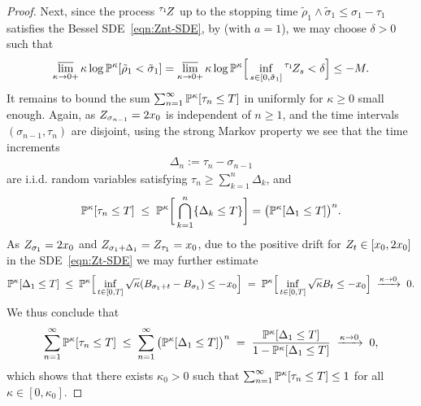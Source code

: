 \documentclass[a4paper, 11pt]{article}
\theoremstyle{definition}
\numberwithin{equation}{section}
\numberwithin{figure}{section}
\renewcommand{\limsup}{\varlimsup}
\newcommand{\Zprocess}[1][]{{\ifx&#1&\else{^{#1 \!}}\fi}Z}
\newcommand{\BMmeasure}[2][]{\bP^{#2}_{\!#1}}
\begin{document}
\begin{proof}
Next, since the process $\Zprocess[\tau_1]$ up to the stopping time $\tilde \rho_1 \wedge \tilde \sigma_1 \le \sigma_1-\tau_1$ 
satisfies the Bessel SDE~\eqref{eqn:Znt-SDE}, 
by  (with $a=1$),  
we may choose $\delta > 0$ such that 
\begin{align*}
\limsup_{\kappa \to 0+} \kappa\log\BMmeasure{\kappa}[\tilde \rho_1 < \tilde \sigma_1] 
= \limsup_{\kappa \to 0+}\kappa\log\BMmeasure{\kappa} \Big[\inf_{s \in [0,\tilde \sigma_1]} \Zprocess[\tau_1]_s < \delta \Big] \le -M.
\end{align*}
It remains to bound the sum $\sum_{n = 1}^\infty \BMmeasure{\kappa}[\tau_n \le T]$ in  
uniformly for $\kappa \geq 0$ small enough. 
Again, as $\Zprocess_{\sigma_{n-1}} = 2x_0$ is independent of $n \ge 1$, and the time intervals $(\sigma_{n-1}, \tau_n)$ are disjoint, 
using the strong Markov property we see that the time increments
\begin{align*}
\Delta_n := \tau_{n}-\sigma_{n-1}
\end{align*}
are i.i.d. random variables satisfying $\tau_n \ge \sum_{k=1}^n \Delta_k$, and
\begin{align*}
\BMmeasure{\kappa} [\tau_n \le T] 
\; \le \; \BMmeasure{\kappa}\bigg[\bigcap_{k=1}^n \{\Delta_k \le T\}\bigg] 
= \big( \BMmeasure{\kappa}[\Delta_1 \le T] \big)^n.
\end{align*}
As $\Zprocess_{\sigma_1} = 2x_0$ and $\Zprocess_{\sigma_1 + \Delta_1} = \Zprocess_{\tau_1} = x_0$, 
due to the positive drift for $\Zprocess_t \in [x_0, 2x_0]$ in the SDE~\eqref{eqn:Zt-SDE} we may further estimate
\begin{align*}
\BMmeasure{\kappa}[\Delta_1 \le T] 
\; \le \; \BMmeasure{\kappa} \Big[\inf_{t \in [0,T]} \sqrt{\kappa} (B_{\sigma_1+t} - B_{\sigma_1}) \le -x_0\Big] 
\; = \; \BMmeasure{\kappa} \Big[\inf_{t \in [0,T]} \sqrt{\kappa} B_t \le -x_0\Big] 
\; \xrightarrow{\kappa \to 0} \;  0.
\end{align*}
We thus conclude that
\begin{align*}
\sum_{n=1}^\infty \BMmeasure{\kappa}[\tau_n \le T] 
\; \le \; \sum_{n=1}^\infty \big( \BMmeasure{\kappa}[\Delta_1 \le T] \big)^n
\; = \; \frac{\BMmeasure{\kappa}[\Delta_1 \le T]}{1-\BMmeasure{\kappa}[\Delta_1 \le T]} 
\; \xrightarrow{\kappa \to 0} \;  0,
\end{align*}
which shows that there exists $\kappa_0 > 0$ 
such that $\sum_{n=1}^\infty \BMmeasure{\kappa}[\tau_n \le T] \le 1$
for all $\kappa \in [0,\kappa_0]$. 
\end{proof}
\end{document}
